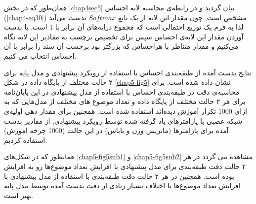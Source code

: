 همان‌طور که در بخش 
\ref{chap4sec5}
بیان گردید و در رابطه‌ی محاسبه لایه احساس (\ref{chap4-eq30}) مشخص است, چون مقدار این لایه از یک تابع 
$Softmax$
بدست می‌آید لذا به فرم یک توزیع احتمالی است که مجموع درایه‌های آن برابر با 1 است. با بدست آوردن مقدار این لایه‌ی احساس سپس برای تخصیص برچسب به مقادیر این لایه نگاه می‌کنیم و مقدار متناطر با هراحساس که بزرگتر بود برچسب آن سند را برابر با آن احساس انتخاب می کنیم.

نتایج بدست آمده از طبقه‌بندی احساس با استفاده از رویکرد پیشنهادی و مدل پایه برای ۲ حالت مختلف از پایگاه داده‌ در شکل
\ref{chap5-fig5}
نشان داده شده است. برای محاسبه‌ی دقت در طبقه‌بندی احساس با استفاده از مدل پیشنهادی در این پایان‌‌نامه برای هر ۲ حالت مختلف از پایگاه داده و تعداد موضوع های مختلف از مدل‌هایی که به ازای 1000 تکرار آموزش دیده‌اند استفاده شده است. همچنین برای مقدار دهی اولیه‌ی شبکه عصبی با پارامترهای یاد گرفته شده توسط رویکرد پیشنهادی, از مقادیر بدست آمده برای پارامترها (ماتریس وزن و بایاس) در این حالت (1000 چرخه اموزش) استفاده کردیم.

همانطور که در شکل‌های 
\ref{chap5-fig5sub1}
و
\ref{chap5-fig5sub2}
مشاهده می گردد در هر ۲ حالت دقت طبقه‌بندی برای مدل پیشنهادی با افزایش تعداد موضوع‌ها رو به افزایش بوده است. همچنین در هر ۲ حالت دقت طبقه‌بندی با استفاده از مدل پیشنهادی با افزایش تعداد موضوع‌ها با اختلاف بسيار زیادی از دقت بدست آمده توسط مدل ‌پایه بهتر است. 

